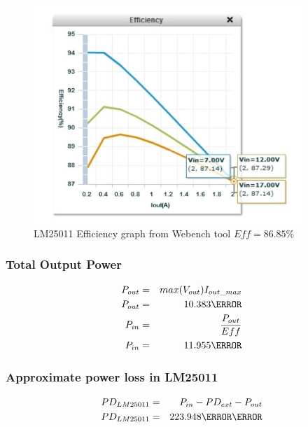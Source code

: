 \begin{figure}[htbp]
\begin{center}
\includegraphics[width=4in]{includes/eff}
\caption{LM25011 Efficiency graph from Webench tool $Eff=86.85\percent$}
\end{center}
\end{figure}


\subsubsection{Total Output Power}
\begin{eqnarray}
P_{out}&=&max(V_{out})I_{out\_max}\\
P_{out}&=&10.383\watt\\
P_{in}&=&\frac{P_{out}}{Eff}\\
P_{in}&=&11.955\watt
\end{eqnarray}

\subsubsection{Approximate power loss in LM25011}
\begin{eqnarray}
PD_{LM25011}&=&P_{in}-PD_{ext}-P_{out}\\
PD_{LM25011}&=&223.948\milli\watt
\end{eqnarray}

